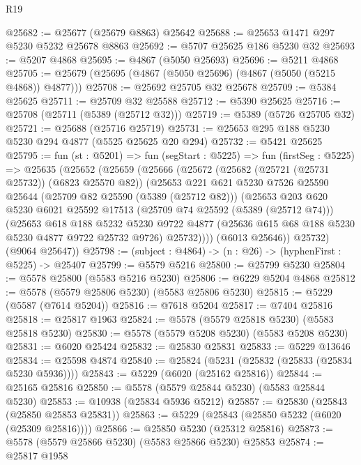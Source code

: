 \begin{lexlean}{R19}
\begin{coremodule}
@25682 := @25677 (@25679 @8863) @25642
@25688 := @25653 @1471 @297 @5230 @5232 @25678 @8863
@25692 := @5707 @25625 @186 @5230 @32
@25693 := @5207 @4868
@25695 := @4867 (@5050 @25693)
@25696 := @5211 @4868
@25705 := @25679 (@25695 (@4867 (@5050 @25696) (@4867 (@5050 (@5215 @4868)) @4877)))
@25708 := @25692 @25705 @32 @25678
@25709 := @5384 @25625
@25711 := @25709 @32 @25588
@25712 := @5390 @25625
@25716 := @25708 (@25711 (@5389 (@25712 @32)))
@25719 := @5389 (@5726 @25705 @32)
@25721 := @25688 (@25716 @25719)
@25731 := @25653 @295 @188 @5230 @5230 @294 @4877 (@5525 @25625 @20 @294)
@25732 := @5421 @25625
@25795 := fun (st : @5201) =>
  fun (segStart : @5225) =>
  fun (firstSeg : @5225) =>
  @25635
    (@25652
      (@25659
        (@25666
          (@25672
            (@25682 (@25721 (@25731 @25732)) (@6823 @25570 @82))
            (@25653
              @221
              @621
              @5230
              @7526
              @25590
              @25644
              (@25709 @82 @25590 (@5389 (@25712 @82)))
              (@25653
                @203
                @620
                @5230
                @6021
                @25592
                @17513
                (@25709 @74 @25592 (@5389 (@25712 @74)))
                (@25653
                  @618
                  @188
                  @5232
                  @5230
                  @9722
                  @4877
                  (@25636 @615 @68 @188 @5230 @5230 @4877 @9722 @25732 @9726)
                  @25732))))
          (@6013 @25646))
        @25732)
      (@9064 @25647))
@25798 := (subject : @4864) -> (n : @26) -> (hyphenFirst : @5225) -> @25407
@25799 := @5579 @5216
@25800 := @25799 @5230
@25804 := @5578 @25800 (@5583 @5216 @5230)
@25806 := @6229 @5204 @4868
@25812 := @5578 (@5579 @25806 @5230) (@5583 @25806 @5230)
@25815 := @5229 (@5587 (@7614 @5204))
@25816 := @7618 @5204
@25817 := @7404 @25816
@25818 := @25817 @1963
@25824 := @5578 (@5579 @25818 @5230) (@5583 @25818 @5230)
@25830 := @5578 (@5579 @5208 @5230) (@5583 @5208 @5230)
@25831 := @6020 @25424
@25832 := @25830 @25831
@25833 := @5229 @13646
@25834 := @25598 @4874
@25840 := @25824 (@5231 (@25832 (@25833 (@25834 @5230 @5936))))
@25843 := @5229 (@6020 (@25162 @25816))
@25844 := @25165 @25816
@25850 := @5578 (@5579 @25844 @5230) (@5583 @25844 @5230)
@25853 := @10938 (@25834 @5936 @5212)
@25857 := @25830 (@25843 (@25850 @25853 @25831))
@25863 := @5229 (@25843 (@25850 @5232 (@6020 (@25309 @25816))))
@25866 := @25850 @5230 (@25312 @25816)
@25873 := @5578 (@5579 @25866 @5230) (@5583 @25866 @5230) @25853
@25874 := @25817 @1958

\end{coremodule}
\end{lexlean}
